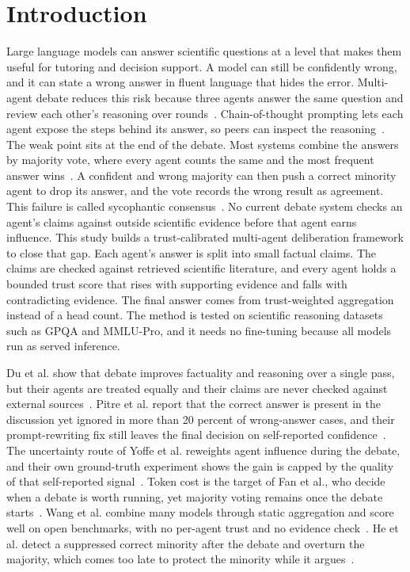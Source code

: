 \documentclass[a4paper,fleqn]{cas-sc}
\begin{document}
\section{Introduction}\label{sec1}

Large language models can answer scientific questions at a level that makes them useful for tutoring and decision support. A model can still be confidently wrong, and it can state a wrong answer in fluent language that hides the error. Multi-agent debate reduces this risk because three agents answer the same question and review each other's reasoning over rounds~\cite{du2024improving}. Chain-of-thought prompting lets each agent expose the steps behind its answer, so peers can inspect the reasoning~\cite{wei2022chain}. The weak point sits at the end of the debate. Most systems combine the answers by majority vote, where every agent counts the same and the most frequent answer wins~\cite{wang-etal-2024-rethinking-bounds,choi2025debate}. A confident and wrong majority can then push a correct minority agent to drop its answer, and the vote records the wrong result as agreement. This failure is called sycophantic consensus~\cite{pitre-etal-2025-consensagent,he2026minority}. No current debate system checks an agent's claims against outside scientific evidence before that agent earns influence. This study builds a trust-calibrated multi-agent deliberation framework to close that gap. Each agent's answer is split into small factual claims. The claims are checked against retrieved scientific literature, and every agent holds a bounded trust score that rises with supporting evidence and falls with contradicting evidence. The final answer comes from trust-weighted aggregation instead of a head count. The method is tested on scientific reasoning datasets such as GPQA and MMLU-Pro, and it needs no fine-tuning because all models run as served inference.

Du et al. show that debate improves factuality and reasoning over a single pass, but their agents are treated equally and their claims are never checked against external sources~\cite{du2024improving}. Pitre et al. report that the correct answer is present in the discussion yet ignored in more than 20 percent of wrong-answer cases, and their prompt-rewriting fix still leaves the final decision on self-reported confidence~\cite{pitre-etal-2025-consensagent}. The uncertainty route of Yoffe et al. reweights agent influence during the debate, and their own ground-truth experiment shows the gain is capped by the quality of that self-reported signal~\cite{yoffe-etal-2025-debunc}. Token cost is the target of Fan et al., who decide when a debate is worth running, yet majority voting remains once the debate starts~\cite{fan2026imad}. Wang et al. combine many models through static aggregation and score well on open benchmarks, with no per-agent trust and no evidence check~\cite{wang2025mixture}. He et al. detect a suppressed correct minority after the debate and overturn the majority, which comes too late to protect the minority while it argues~\cite{he2026minority}.
\end{document}

